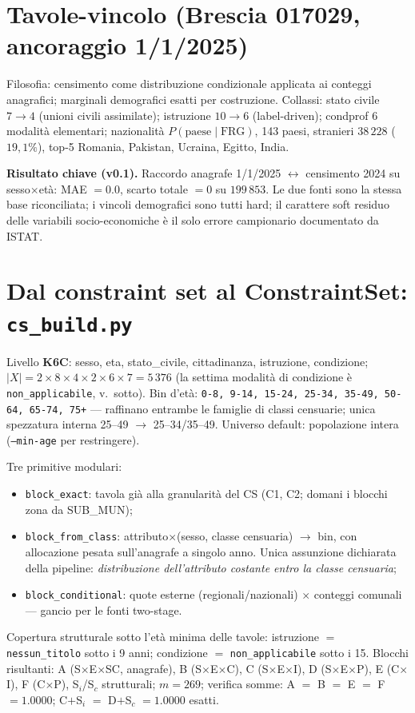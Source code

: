 \documentclass[11pt,a4paper]{article}
\newcommand{\code}[1]{\texttt{#1}}
\begin{document}
\section{Tavole-vincolo (Brescia 017029, ancoraggio 1/1/2025)}
Filosofia: censimento come distribuzione condizionale applicata ai conteggi
anagrafici; marginali demografici esatti per costruzione.
Collassi: stato civile $7\to4$ (unioni civili assimilate); istruzione $10\to6$
(label-driven); condprof 6 modalit\`a elementari; nazionalit\`a
$P(\text{paese}\mid\text{FRG})$, 143 paesi, stranieri $38\,228$ ($19{,}1\%$),
top-5 Romania, Pakistan, Ucraina, Egitto, India.

\medskip\noindent\textbf{Risultato chiave (v0.1).} Raccordo anagrafe
1/1/2025 $\leftrightarrow$ censimento 2024 su sesso$\times$et\`a:
MAE $=0.0$, scarto totale $=0$ su $199\,853$. Le due fonti sono la stessa base
riconciliata; i vincoli demografici sono tutti hard; il carattere soft residuo
delle variabili socio-economiche \`e il solo errore campionario documentato da
ISTAT.

\section{Dal constraint set al ConstraintSet: \code{cs\_build.py}}
\label{sec:csbuild}
Livello \textbf{K6C}: sesso, eta, stato\_civile, cittadinanza, istruzione,
condizione; $|X| = 2\times8\times4\times2\times6\times7 = 5\,376$
(la settima modalit\`a di condizione \`e \code{non\_applicabile}, v.\ sotto).
Bin d'et\`a: \code{0-8, 9-14, 15-24, 25-34, 35-49, 50-64, 65-74, 75+} ---
raffinano entrambe le famiglie di classi censuarie; unica spezzatura interna
25--49 $\to$ 25--34/35--49. Universo default: popolazione intera
(\code{--min-age} per restringere).

\medskip\noindent Tre primitive modulari:
\begin{itemize}[leftmargin=*]
  \item \code{block\_exact}: tavola gi\`a alla granularit\`a del CS (C1, C2;
  domani i blocchi zona da SUB\_MUN);
  \item \code{block\_from\_class}: attributo$\times$(sesso, classe censuaria)
  $\to$ bin, con allocazione pesata sull'anagrafe a singolo anno. Unica
  assunzione dichiarata della pipeline: \emph{distribuzione dell'attributo
  costante entro la classe censuaria};
  \item \code{block\_conditional}: quote esterne (regionali/nazionali)
  $\times$ conteggi comunali --- gancio per le fonti two-stage.
\end{itemize}
Copertura strutturale sotto l'et\`a minima delle tavole: istruzione
$=$ \code{nessun\_titolo} sotto i 9 anni; condizione $=$ \code{non\_applicabile}
sotto i 15. Blocchi risultanti: A (S$\times$E$\times$SC, anagrafe),
B (S$\times$E$\times$C), C (S$\times$E$\times$I), D (S$\times$E$\times$P),
E (C$\times$I), F (C$\times$P), S$_i$/S$_c$ strutturali; $m=269$;
verifica somme: A $=$ B $=$ E $=$ F $= 1.0000$;
C$+$S$_i$ $=$ D$+$S$_c$ $= 1.0000$ esatti.
\end{document}
